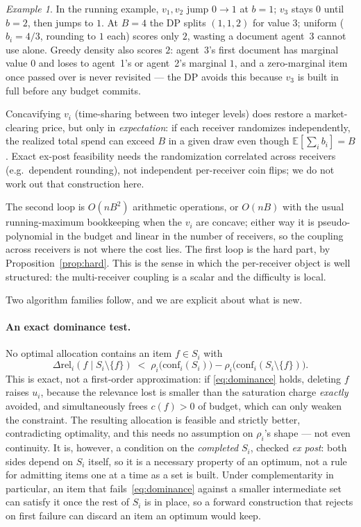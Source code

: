 \documentclass[sigconf,anonymous]{aamas}
\theoremstyle{remark}
\newtheorem{example}{Example}
\begin{document}
\begin{example}
\label{ex:dp}
In the running example, $v_1,v_2$ jump $0\to1$ at $b=1$; $v_3$ stays
$0$ until $b=2$, then jumps to $1$. At $B=4$ the DP splits $(1,1,2)$ for
value $3$; uniform ($b_i=4/3$, rounding to $1$ each) scores only $2$,
wasting a document agent~3 cannot use alone. Greedy density also scores
$2$: agent~3's first document has marginal value $0$ and loses to
agent~1's or agent~2's marginal $1$, and a zero-marginal item once
passed over is never revisited --- the DP avoids this because $v_3$ is
built in full before any budget commits.
\end{example}

Concavifying $v_i$ (time-sharing between two integer levels) does
restore a market-clearing price, but only in \emph{expectation}: if
each receiver randomizes independently, the realized total spend can
exceed $B$ in a given draw even though $\mathbb{E}[\sum_i b_i]=B$.
Exact ex-post feasibility needs the randomization correlated across
receivers (e.g.\ dependent rounding), not independent per-receiver
coin flips; we do not work out that construction here.

The second loop is $O(nB^2)$ arithmetic operations, or $O(nB)$ with the
usual running-maximum bookkeeping when the $v_i$ are concave; either
way it is pseudo-polynomial in the budget and linear in the number of
receivers, so the coupling across receivers is not where the cost
lies. The first loop is the hard part, by
Proposition~\ref{prop:hard}. This is the sense in which the
per-receiver object is well structured: the multi-receiver coupling is
a scalar and the difficulty is local.

Two algorithm families follow, and we are explicit about what is new.

\paragraph{An exact dominance test.} No optimal allocation contains an
item $f \in S_i$ with
\begin{equation}
\Delta\mathrm{rel}_i(f \mid S_i\setminus\{f\}) \;<\;
\rho_i\bigl(\mathrm{conf}_i(S_i)\bigr) - \rho_i\bigl(\mathrm{conf}_i(S_i\setminus\{f\})\bigr).
\label{eq:dominance}
\end{equation}
This is exact, not a first-order approximation: if \eqref{eq:dominance}
holds, deleting $f$ raises $u_i$, because the relevance lost is smaller
than the saturation charge \emph{exactly} avoided, and simultaneously
frees $c(f)>0$ of budget, which can only weaken the constraint. The
resulting allocation is feasible and strictly better, contradicting
optimality, and this needs no assumption on $\rho_i$'s shape --- not
even continuity. It is, however, a condition on the \emph{completed}
$S_i$, checked \emph{ex post}: both sides depend on $S_i$ itself, so it
is a necessary property of an optimum, not a rule for admitting items
one at a time as a set is built. Under complementarity in particular,
an item that fails~\eqref{eq:dominance} against a smaller intermediate
set can satisfy it once the rest of $S_i$ is in place, so a forward
construction that rejects on first failure can discard an item an
optimum would keep.
\end{document}
